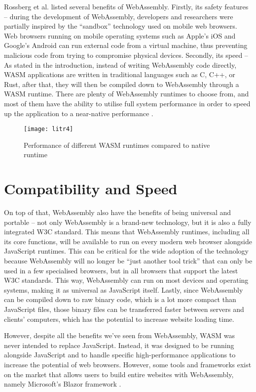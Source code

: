 Rossberg et al. listed several benefits of WebAssembly. Firstly, its safety features – during the development of WebAssembly, developers and researchers were partially inspired by the “sandbox” technology used on mobile web browsers. Web browsers running on mobile operating systems such as Apple's iOS and Google's Android can run external code from a virtual machine, thus preventing malicious code from trying to compromise physical devices. Secondly, its speed – As stated in the introduction, instead of writing WebAssembly code directly, WASM applications are written in traditional languages such as C, C++, or Rust, after that, they will then be compiled down to WebAssembly through a WASM runtime. There are plenty of WebAssembly runtimes to choose from, and most of them have the ability to utilise full system performance in order to speed up the application to a near-native performance \cite{lit12}.

\bigskip
\begin{figure}[hp]
\centering
\texttt{[image: litr4]}
\caption{\footnotesize{Performance of different WASM runtimes compared to native runtime \cite{lit12}}}
\captionsetup{aboveskip=0pt,font=it}
\end{figure}
\bigskip

\bigskip
\section{Compatibility and Speed}

On top of that, WebAssembly also have the benefits of being universal and portable – not only WebAssembly is a brand-new technology, but it is also a fully integrated W3C standard. This means that WebAssembly runtimes, including all its core functions, will be available to run on every modern web browser alongside JavaScript runtimes. This can be critical for the wide adoption of the technology because WebAssembly will no longer be “just another tool trick” that can only be used in a few specialised browsers, but in all browsers that support the latest W3C standards. This way, WebAssembly can run on most devices and operating systems, making it as universal as JavaScript itself. Lastly, since WebAssembly can be compiled down to raw binary code, which is a lot more compact than JavaScript files, those binary files can be transferred faster between servers and clients’ computers, which has the potential to increase website loading time.

However, despite all the benefits we’ve seen from WebAssembly, WASM was never intended to replace JavaScript. Instead, it was designed to be running alongside JavaScript and to handle specific high-performance applications to increase the potential of web browsers. However, some tools and frameworks exist on the market that allows users to build entire websites with WebAssembly, namely Microsoft’s Blazor framework \cite{lit13}.

